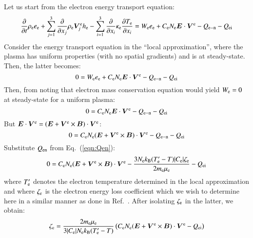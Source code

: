 \documentclass{warpdoc}
\renewcommand{\vec}[1]{\bm{#1}}
\begin{document}
Let us start from the electron energy transport equation:
%
\begin{equation}
\frac{\partial }{\partial t}\rho_{\rm e} e_{\rm e} + \sum_{j=1}^3  \frac{\partial }{\partial x_j} \rho_{\rm e} \vec{V}^{\rm e}_j h_{\rm e} 
-\sum_{i=1}^{3}\frac{\partial }{\partial x_i}\kappa_{\rm e}\frac{\partial T_{\rm e}}{\partial x_i}
= 
 W_{\rm e} e_{\rm e}
+   C_{\rm e} N_{\rm e} \vec{E} \cdot \vec{V}^{\rm e}  
- Q_{\rm e-n}
- Q_{\rm ei}
\end{equation}
%
Consider the energy transport equation in the ``local approximation'', where the plasma has uniform properties (with no spatial gradients) and is at steady-state. Then, the latter becomes:
%
\begin{equation}
0
= 
 W_{\rm e} e_{\rm e}
+   C_{\rm e} N_{\rm e} \vec{E} \cdot \vec{V}^{\rm e}  
- Q_{\rm e-n}
- Q_{\rm ei}
\end{equation}
%
Then, from noting that electron mass conservation equation would yield $W_{\rm e}=0$ at steady-state for a uniform plasma:
%
\begin{equation}
0
= 
   C_{\rm e} N_{\rm e} \vec{E} \cdot \vec{V}^{\rm e}  
- Q_{\rm e-n}
- Q_{\rm ei}
\end{equation}
%
But $\vec{E} \cdot \vec{V}^{\rm e}=(\vec{E}+\vec{V}^{\rm e}\times\vec{B}) \cdot \vec{V}^{\rm e}$:
%
\begin{equation}
0
= 
   C_{\rm e} N_{\rm e} (\vec{E}+\vec{V}^{\rm e}\times\vec{B}) \cdot \vec{V}^{\rm e}  
- Q_{\rm e-n}
- Q_{\rm ei}
\end{equation}
%
Substitute $Q_{\rm en}$ from Eq.\ (\ref{eqn:Qen}):
%
\begin{equation}
0
= 
   C_{\rm e} N_{\rm e} (\vec{E}+\vec{V}^{\rm e}\times\vec{B}) \cdot \vec{V}^{\rm e}  
- \frac{3 N_{\rm e}k_{\rm B} (T_{\rm e}^\prime-T)  |C_{\rm e}| \zeta_{\rm e}}{2 m_{\rm e}\mu_{\rm e}}
- Q_{\rm ei}
\end{equation}
%
where $T_{\rm e}^\prime$ denotes the electron temperature determined in the local approximation and where $\zeta_{\rm e}$ is the electron energy loss coefficient which we wish to determine here in a similar manner as done in Ref.\ \cite{misc:1995:boeuf}. After isolating $\zeta_{\rm e}$ in the latter, we obtain:
%
\begin{equation}
  \zeta_{\rm e}   
=  
 \frac{2 m_{\rm e} \mu_{\rm e}}{3 |C_{\rm e}| N_{\rm e} k_{\rm B} (T_{\rm e}^\prime-T) }
\left(  C_{\rm e} N_{\rm e} (\vec{E}+\vec{V}^{\rm e}\times\vec{B}) \cdot \vec{V}^{\rm e}
 - Q_{\rm ei}\right)
\label{eqn:oldzetae}
 \end{equation}
\end{document}
